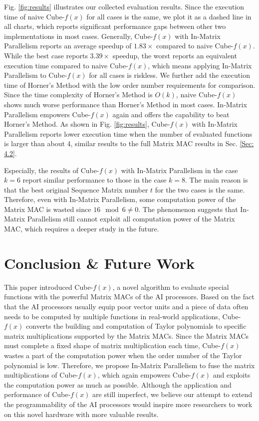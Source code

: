\documentclass[12pt]{extbook}
\begin{document}
Fig. \ref{fig:results} illustrates our collected evaluation results. Since the execution time of naive Cube-$f(x)$ for all cases is the same, we plot it as a dashed line in all charts, which reports significant performance gaps between other two implementations in most cases. Generally, Cube-$f(x)$ with In-Matrix Parallelism reports an average speedup of $1.83\times$ compared to naive Cube-$f(x)$. While the best case reports $3.39\times$ speedup, the worst reports an equivalent execution time compared to naive Cube-$f(x)$, which means applying In-Matrix Parallelism to Cube-$f(x)$ for all cases is riskless. We further add the execution time of Horner's Method with the low order number requirements for comparison. Since the time complexity of Horner's Method is $O(k)$, naive Cube-$f(x)$ shows much worse performance than Horner's Method in most cases. In-Matrix Parallelism empowers Cube-$f(x)$ again and offers the capability to beat Horner's Method. As shown in Fig. \ref{fig:results}, Cube-$f(x)$ with In-Matrix Parallelism reports lower execution time when the number of evaluated functions is larger than about 4, similar results to the full Matrix MAC results in Sec. \ref{Sec: 4.2}. 

Especially, the results of Cube-$f(x)$ with In-Matrix Parallelism in the case $k = 6$ report similar performance to those in the case $k = 8$. The main reason is that the best original Sequence Matrix number $t$ for the two cases is the same. Therefore, even with In-Matrix Parallelism, some computation power of the Matrix MAC is wasted since $16 \mod 6 \neq 0$. The phenomenon suggests that In-Matrix Parallelism still cannot exploit all computation power of the Matrix MAC, which requires a deeper study in the future.

\section{Conclusion \& Future Work \label{sec:8}}

This paper introduced Cube-$f(x)$, a novel algorithm to evaluate special functions with the powerful Matrix MACs of the AI processors. Based on the fact that the AI processors usually equip poor vector units and a piece of data often needs to be computed by multiple functions in real-world applications, Cube-$f(x)$ converts the building and computation of Taylor polynomials to specific matrix multiplications supported by the Matrix MACs. Since the Matrix MACs must complete a fixed shape of matrix multiplication each time, Cube-$f(x)$ wastes a part of the computation power when the order number of the Taylor polynomial is low. Therefore, we propose In-Matrix Parallelism to fuse the matrix multiplications of Cube-$f(x)$, which again empowers Cube-$f(x)$ and exploits the computation power as much as possible. Although the application and performance of Cube-$f(x)$ are still imperfect, we believe our attempt to extend the programmability of the AI processors would inspire more researchers to work on this novel hardware with more valuable results.
\end{document}
